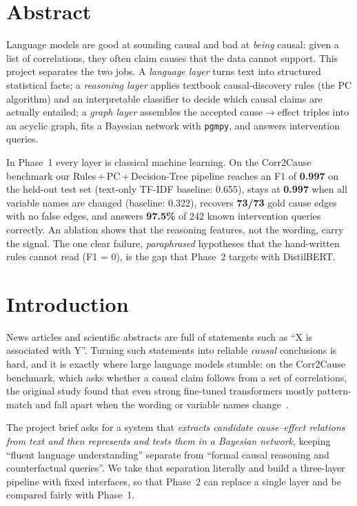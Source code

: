 \documentclass[12pt,a4paper]{article}
\begin{document}
\section{Abstract}
Language models are good at sounding causal and bad at \emph{being} causal: given a list of
correlations, they often claim causes that the data cannot support. This project separates the two jobs.
A \emph{language layer} turns text into structured statistical facts; a \emph{reasoning layer} applies
textbook causal-discovery rules (the PC algorithm) and an interpretable classifier to decide which causal
claims are actually entailed; a \emph{graph layer} assembles the accepted cause$\rightarrow$effect triples
into an acyclic graph, fits a Bayesian network with \texttt{pgmpy}, and answers intervention queries.

In Phase~1 every layer is classical machine learning. On the Corr2Cause benchmark our
Rules\,+\,PC\,+\,Decision-Tree pipeline reaches an F1 of \textbf{0.997} on the held-out test set
(text-only TF-IDF baseline: 0.655), stays at \textbf{0.997} when all variable names are changed
(baseline: 0.322), recovers \textbf{73/73} gold cause edges with no false edges, and answers
\textbf{97.5\%} of 242 known intervention queries correctly. An ablation shows that the reasoning
features, not the wording, carry the signal. The one clear failure, \emph{paraphrased} hypotheses that the
hand-written rules cannot read (F1 = 0), is the gap that Phase~2 targets with DistilBERT.

\section{Introduction}

News articles and scientific abstracts are full of statements such as ``X is associated with Y''.
Turning such statements into reliable \emph{causal} conclusions is hard, and it is exactly where
large language models stumble: on the Corr2Cause benchmark, which asks whether a causal claim follows
from a set of correlations, the original study found that even strong fine-tuned transformers mostly
pattern-match and fall apart when the wording or variable names change~\cite{jin2024corr2cause}.

The project brief asks for a system that \emph{extracts candidate cause--effect relations from text and
then represents and tests them in a Bayesian network}, keeping ``fluent language understanding'' separate
from ``formal causal reasoning and counterfactual queries''. We take that separation literally and build a
three-layer pipeline with fixed interfaces, so that Phase~2 can replace a single layer and be compared
fairly with Phase~1.
\end{document}
